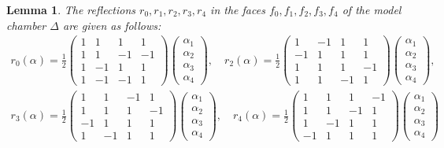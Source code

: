 \documentclass[12pt,letterpaper,reqno]{amsart}
\def\bm#1{#1}%
\newtheorem{lem}[thm]{Lemma}
\theoremstyle{remark}
\theoremstyle{definition}
\numberwithin{thm}{section}
\numberwithin{equation}{section}
\numberwithin{figure}{section}
\newcommand{\bfalpha}{\ensuremath{\bm \alpha}}
\begin{document}
\begin{lem}\label{lem:reflections}
The reflections $r_0, r_1, r_2, r_3, r_4$ in the faces $f_0, f_1, f_2, f_3, f_4$ of the model chamber $\Delta$ are given as follows:
\[
\begin{gathered}
	r_0(\bfalpha) = \frac{1}{2} \begin{pmatrix}
 1 & 1 &1 & 1\\
 	1 & 1 & -1 & -1\\
 	1 & -1 &1 & 1\\
 	1 & -1 &-1 & 1
 \end{pmatrix}
\begin{pmatrix}
\alpha_1 \\ \alpha_2 \\ \alpha_3 \\ \alpha_4	
\end{pmatrix}, \quad 
r_2(\bfalpha) = \frac{1}{2} \begin{pmatrix}
 1 & -1 &1 & 1\\
 	-1 & 1 & 1 & 1\\
 	1 & 1 &1 & -1\\
 	1 & 1 &-1 & 1
 \end{pmatrix}
\begin{pmatrix}
\alpha_1 \\ \alpha_2 \\ \alpha_3 \\ \alpha_4	
\end{pmatrix},\\
r_3(\bfalpha) = \frac{1}{2} \begin{pmatrix}
 1 & 1 & -1 & 1\\
 	1 & 1 & 1 & -1\\
 	-1 & 1 &1 & 1\\
 	1 & -1 &1 & 1
 \end{pmatrix}
\begin{pmatrix}
\alpha_1 \\ \alpha_2 \\ \alpha_3 \\ \alpha_4	
\end{pmatrix}, \quad 
r_4(\bfalpha) = \frac{1}{2} \begin{pmatrix}
 1 & 1 &1 & -1\\
 	1 & 1 & -1 & 1\\
 	1 & -1 &1 & 1\\
 	-1 & 1 &1 & 1
 \end{pmatrix}
\begin{pmatrix}
\alpha_1 \\ \alpha_2 \\ \alpha_3 \\ \alpha_4	

\end{pmatrix}
\end{gathered}\]
\end{lem}
\end{document}
